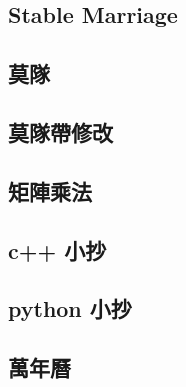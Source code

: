 \subsection{Stable Marriage}

\subsection{莫隊}

\subsection{莫隊帶修改}

\subsection{矩陣乘法}

\subsection{c++ 小抄}

\subsection{python 小抄}

\subsection{萬年曆}


